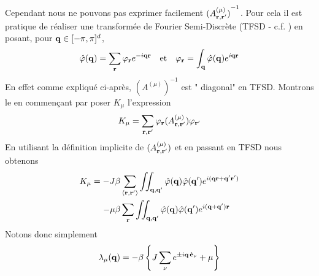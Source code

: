 \documentclass[10pt]{article}
\begin{document}
\begin{multicols}{2}
Cependant nous ne pouvons pas exprimer facilement ${(A_{{\bf r}, {\bf r}'}^{(\mu)})}^{-1}$. Pour cela il est pratique de réaliser une transformée de Fourier Semi-Discrète (TFSD - c.f. ) en posant, pour ${\bf q} \in [-\pi, \pi]^d$,
\begin{equation}
  \hat{\varphi}({\bf q}) = \sum_{\bf r} \varphi_{\bf r} e^{-i{\bf q}{\bf r}} \quad \text{et} \quad \varphi_{\bf r} = \int_{\bf q} \hat{\varphi}({\bf q})  e^{i{\bf q}{\bf r}}
\end{equation}
En effet comme expliqué ci-après, ${(A^{(\mu)})}^{-1}$ est " diagonal" en TFSD. Montrons le en commençant par poser $K_\mu$ l'expression
\begin{equation}
	K_\mu = \sum\limits_{{\bf r}, {\bf r}'} \varphi_{\bf r} {(A_{{\bf r}, {\bf r}'}^{(\mu)})} \varphi_{{\bf r}'}
\end{equation} 
En utilisant la définition implicite de ${(A_{{\bf r}, {\bf r}'}^{(\mu)})}$ et en passant en TFSD nous obtenons
\begin{equation}
\begin{split}
  K_\mu = -J\beta & \sum_{\left<{\bf r}, {\bf r}'\right>} \iint_{{\bf q},{\bf q}'} \hat{\varphi}({\bf q}) \hat{\varphi}({\bf q}')  e^{i({\bf q}{\bf r}+{\bf q}'{\bf r}')} \\
   -\mu\beta & \sum_{\bf r} \iint_{{\bf q},{\bf q}'} \hat{\varphi}({\bf q}) \hat{\varphi}({\bf q}')  e^{i({\bf q}+{\bf q}'){\bf r}}
\end{split}
\end{equation}
Notons donc simplement
\begin{equation}
  \lambda_\mu({\bf q}) = -\beta \left\{ J\sum_{\nu} e^{ \pm i {\bf q} \, \hat{\mathbf{e}}_\nu} +\mu \right\} 
\end{equation}

\end{multicols}
\end{document}
